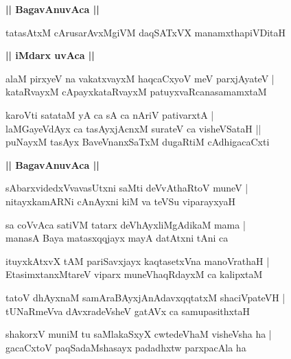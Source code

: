 \documentclass[twoside,12pt,openright]{book}
\newcounter{shloka}[chapter]
\def\uvaca#1{\centerline{{\large\textbf{#1}}}}
\begin{document}
\uvaca{|| BagavAnuvAca ||}

\begin{shloka}%
tatasAtxM cArusarAvxMgiVM daqSATxVX manamxthapiVDitaH 
\end{shloka}

\uvaca{|| iMdarx uvAca ||}

\begin{shloka}%
alaM pirxyeV na vakatxvayxM haqcaCxyoV meV parxjAyateV |\\
kataRvayxM cApayxkataRvayxM patuyxvaRcanasamamxtaM 
\end{shloka}

\begin{shloka}%
karoVti satataM yA ca sA ca nAriV pativarxtA |\\
laMGayeVdAyx ca tasAyxjAcnxM surateV ca visheVSataH ||\\
puNayxM tasAyx BaveVnanxSaTxM dugaRtiM cAdhigacaCxti 
\end{shloka}

\uvaca{|| BagavAnuvAca ||}

\begin{shloka}%
sAbarxvidedxVvavasUtxni saMti deVvAthaRtoV muneV |\\
nitayxkamARNi cAnAyxni kiM va teVSu viparayxyaH 
\end{shloka}

\begin{shloka}%
sa coVvAca satiVM tatarx deVhAyxliMgAdikaM mama |\\
manasA Baya matasxqqjayx mayA datAtxni tAni ca 
\end{shloka}

\begin{shloka}%
ituyxkAtxvX tAM pariSavxjayx kaqtasetxVna manoVrathaH |\\
EtasimxtanxMtareV viparx muneVhaqRdayxM ca kalipxtaM 
\end{shloka}

\begin{shloka}%
tatoV dhAyxnaM samAraBAyxjAnAdavxqqtatxM shaciVpateVH |\\
tUNaRmeVva dAvxradeVsheV gatAVx ca samupasithxtaH 
\end{shloka}

\begin{shloka}%
shakorxV muniM tu saMlakaSxyX cwtedeVhaM visheVsha ha |\\
gacaCxtoV paqSadaMshasayx padadhxtw parxpacAla ha 
\end{shloka}
\end{document}
